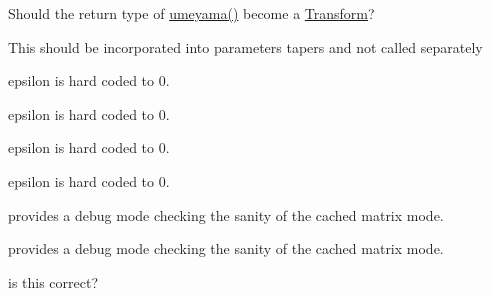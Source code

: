\begin{DoxyRefList}
\label{todo__todo000254}%
%
Should the return type of \mbox{\hyperlink{group___geometry___module_ga033d6550c1fc82e232f2b4c380c19a54}{umeyama()}} become a \mbox{\hyperlink{class_eigen_1_1_transform}{Transform}}? 
\item[Member \mbox{\hyperlink{_a_a_x___common_conversions_8h_a76f29f12e35c093e5c198b8d0e27b6f9}{Gain\+To\+DB}} (double a\+Gain)]\label{todo__todo000018}%
%
This should be incorporated into parameters\textquotesingle{} tapers and not called separately  
\item[Member \mbox{\hyperlink{group__gtx__vector__angle_ga82a19d474be13c92c7b10caab42a5a72}{glm::oriented\+Angle}} (tvec2$<$ T, P $>$ const \&x, tvec2$<$ T, P $>$ const \&y)]\label{todo__todo000001}%
%
epsilon is hard coded to 0. 

\label{todo__todo000002}%
%
epsilon is hard coded to 0. 

\label{todo__todo000003}%
%
epsilon is hard coded to 0. 

\label{todo__todo000004}%
%
epsilon is hard coded to 0.  
\item[Member \mbox{\hyperlink{class_gpu_helper_a52a9ab12d07acbf4ad80737595a9b06e}{Gpu\+Helper::force\+Matrix\+Target}} (G\+Lenum matrix\+Target)]\label{todo__todo000249}%
%
provides a debug mode checking the sanity of the cached matrix mode. 

\label{todo__todo000252}%
%
provides a debug mode checking the sanity of the cached matrix mode.  
\item[Member \mbox{\hyperlink{struct_i_color_a78e2ca9c5fd2956a4b35d79772087553}{I\+Color::Get\+Luminosity}} () const]\label{todo__todo000146}%
%
 

\label{todo__todo000147}%
%
  
\item[Member \mbox{\hyperlink{class_i_editor_delegate_ab0a2c692543f2793bf68b3f24b20b8fa}{I\+Editor\+Delegate::Send\+Sysex\+Msg\+From\+UI}} (const \mbox{\hyperlink{struct_i_sys_ex}{I\+Sys\+Ex}} \&msg)]\label{todo__todo000176}%
%
is this correct?  
\item[Member \mbox{\hyperlink{class_i_editor_delegate_a7210e7a0b067602ee62941a53b6d0e29}{I\+Editor\+Delegate::Set\+Size\+Constraints}} (int width\+Lo, int width\+Hi, int height\+Lo, int height\+Hi)]\label{todo__todo000177}%
%
 


\end{DoxyRefList}
